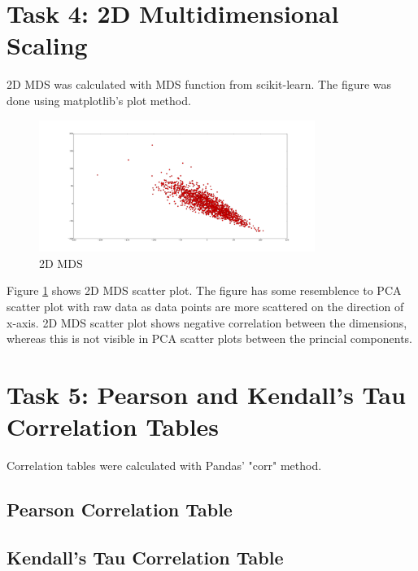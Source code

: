 \documentclass[12pt]{article}
\begin{document}
\section{Task 4: 2D Multidimensional Scaling}

2D MDS was calculated with MDS function from scikit-learn. The figure was done using matplotlib's plot method.

\begin{figure}[H]
    \centering
    \includegraphics[width=0.8\textwidth]{2d_mds}
    \caption{2D MDS}
    \label{fig:mds}
\end{figure}

Figure \ref{fig:mds} shows 2D MDS scatter plot. The figure has some resemblence to PCA scatter plot with raw data as data points are more scattered on the direction of x-axis. 2D MDS scatter plot shows negative correlation between the dimensions, whereas this is not visible in PCA scatter plots between the princial components.

\section{Task 5: Pearson and Kendall's Tau Correlation Tables}

Correlation tables were calculated with Pandas' "corr" method.

\subsection{Pearson Correlation Table}

\resizebox{\linewidth}{!}{%



}

\subsection{Kendall's Tau Correlation Table}

\resizebox{\linewidth}{!}{%



}
\end{document}
